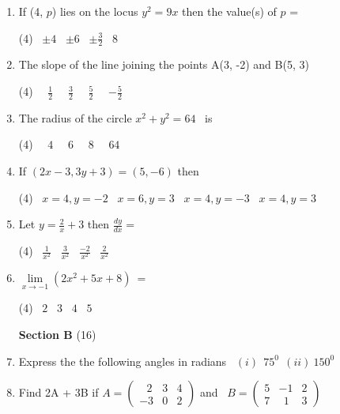 \documentclass[16pt,a4paper]{article}
\begin{document}
\begin {enumerate}

\item If (4, $p$) lies on the locus $y^2 = 9x$ then the value(s) of $p$ =  
\begin{tasks}(4)
\task\ $\pm 4$
\task\ $\pm 6$
\task\ $\pm \frac{3}{2} $
\task\ $ 8$
\end{tasks}

\item The slope of the line joining the points A(3, -2) and B(5, 3)
\begin{tasks}(4)
\task\ \ $\frac{1}{2}$
\task\ \ $\frac{3}{2}$
\task\ \ $\frac{5}{2}$
\task\ \ $-\frac{5}{2}$
\end{tasks}

\item The radius of the circle $x^2 + y^2 = 64$ \ is
\begin{tasks}(4)
\task\ \ $4$
\task\ \ $6$
\task\ \ $8$
\task\ \ $64$
\end{tasks}

\item If $(2x-3,3y+3)=(5,-6)$ then 
\begin{tasks}(4)
\task\ $x=4, y=-2$
\task\ $x=6, y=3 $
\task\ $x=4, y=-3$
\task\ $x=4, y=3 $
\end{tasks}

\item Let $y = \frac{2}{x}+3$ then $\frac{dy}{dx} =$ 
\begin{tasks}(4)
\task\ $\frac{1}{x^2}$
\task\ $\frac{3}{x^2}$
\task\ $\frac{-2}{x^2}$
\task\ $\frac{2}{x^2}$
\end{tasks}

\item \(\lim\limits_{x \to -1 } ( 2x^2 + 5x + 8 )\ =  \)
\begin{tasks}(4)
\task\ $2$
\task\ $3$
\task\ $4$
\task\ $5$
\end{tasks}


\begin{center}
\hfill \textbf{Section B} \tabto{16.9cm}(16)
\end{center}

\item Express the the following angles in radians \ $(i)\ \ 75^0 \ \ (ii) \ 150^0 $
\item Find 2A + 3B if 
\( A = \left( 
\begin{array}{ccc} 
 \ \ \ 2&3&4 \\  -3&0&2
\end{array} 
\right) \) and  \ 
\( B = \left( 
\begin{array}{ccc} 
 5&-1&2 \\  7&\ \ 1&3
\end{array} 
\right) \)
 

\end{enumerate}
\end{document}
